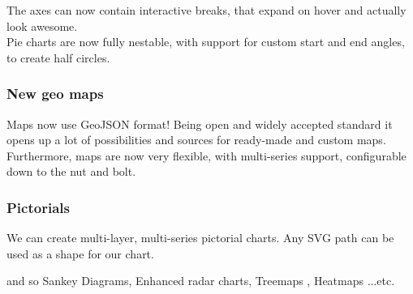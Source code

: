 The axes can now contain interactive breaks, that expand on hover and actually look awesome.\\

Pie charts are now fully nestable, with support for custom start and end angles, to create half circles.
\subsubsection*{New geo maps}
Maps now use GeoJSON format! Being open and widely accepted standard it opens up a lot of possibilities and sources for ready-made and custom maps.\\

Furthermore, maps are now very flexible, with multi-series support, configurable down to the nut and bolt.
\subsubsection*{Pictorials}
We can create multi-layer, multi-series pictorial charts. Any SVG path can be used as a shape for our chart.

and so Sankey Diagrams, Enhanced radar charts, Treemaps , Heatmaps ...etc. 